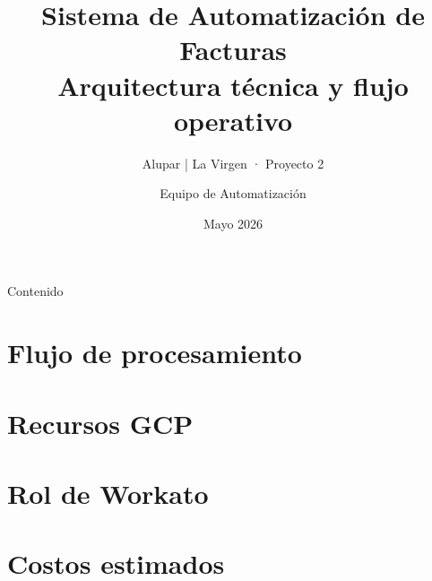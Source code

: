\documentclass[aspectratio=169]{beamer}
\title[Sistema de Facturas PDF/XML]{\textbf{Sistema de Automatización de Facturas}\\\large Arquitectura técnica y flujo operativo}
\subtitle{Alupar | La Virgen · Proyecto 2}
\author{Equipo de Automatización}
\date{Mayo 2026}
\begin{document}
\begin{frame}
\titlepage
\end{frame}

\begin{frame}{Contenido}
\tableofcontents
\end{frame}

\section{Flujo de procesamiento}
\section{Recursos GCP}
\section{Rol de Workato}
\section{Costos estimados}
\end{document}
